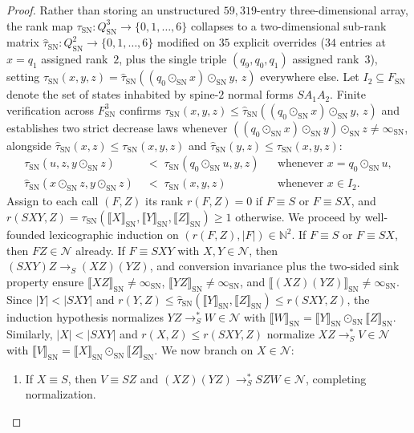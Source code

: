 \documentclass[11pt,reqno]{amsart}
\numberwithin{equation}{section}
\theoremstyle{plain}
\theoremstyle{definition}
\theoremstyle{remark}
\newcommand{\SN}{\mathrm{SN}}
\newcommand{\sem}[1]{\llbracket #1 \rrbracket}
\newcommand{\redS}{\to_S}
\newcommand{\redSs}{\to_S^*}
\begin{document}
\begin{proof}
Rather than storing an unstructured $59{,}319$-entry three-dimensional array, the rank map $\tau_{\SN} \colon Q_{\SN}^3 \to \{0, 1, \dots, 6\}$ collapses to a two-dimensional sub-rank matrix $\hat{\tau}_{\SN} \colon Q_{\SN}^2 \to \{0, 1, \dots, 6\}$ modified on $35$ explicit overrides ($34$ entries at $x = q_1$ assigned rank~$2$, plus the single triple $(q_9, q_0, q_1)$ assigned rank~$3$), setting $\tau_{\SN}(x, y, z) = \hat{\tau}_{\SN}((q_0 \odot_{\SN} x) \odot_{\SN} y,\, z)$ everywhere else. Let $I_2 \subseteq F_{\SN}$ denote the set of states inhabited by spine-$2$ normal forms $S A_1 A_2$. Finite verification across $F_{\SN}^3$ confirms $\tau_{\SN}(x, y, z) \le \hat{\tau}_{\SN}((q_0 \odot_{\SN} x) \odot_{\SN} y,\, z)$ and establishes two strict decrease laws whenever $((q_0 \odot_{\SN} x) \odot_{\SN} y) \odot_{\SN} z \neq \infty_{\SN}$, alongside $\hat{\tau}_{\SN}(x, z) \le \tau_{\SN}(x, y, z)$ and $\hat{\tau}_{\SN}(y, z) \le \tau_{\SN}(x, y, z)$:
\begin{align}
\tau_{\SN}(u, z, y \odot_{\SN} z) &\;<\; \tau_{\SN}(q_0 \odot_{\SN} u, y, z)
&&\textrm{whenever } x = q_0 \odot_{\SN} u, \label{eq:sn-rank-1}\\
\hat{\tau}_{\SN}(x \odot_{\SN} z, y \odot_{\SN} z) &\;<\; \tau_{\SN}(x, y, z)
&&\textrm{whenever } x \in I_2. \label{eq:sn-rank-2}
\end{align}
Assign to each call $(F, Z)$ its rank $r(F, Z) = 0$ if $F \equiv S$ or $F \equiv S X$, and $r(S X Y, Z) = \tau_{\SN}(\sem{X}_{\SN}, \sem{Y}_{\SN}, \sem{Z}_{\SN}) \ge 1$ otherwise. We proceed by well-founded lexicographic induction on $(r(F, Z), |F|) \in \mathbb{N}^2$. If $F \equiv S$ or $F \equiv S X$, then $F Z \in \mathcal{N}$ already. If $F \equiv S X Y$ with $X, Y \in \mathcal{N}$, then $(S X Y) Z \redS (X Z)(Y Z)$, and conversion invariance plus the two-sided sink property ensure $\sem{X Z}_{\SN} \neq \infty_{\SN}$, $\sem{Y Z}_{\SN} \neq \infty_{\SN}$, and $\sem{(X Z)(Y Z)}_{\SN} \neq \infty_{\SN}$. Since $|Y| < |S X Y|$ and $r(Y, Z) \le \hat{\tau}_{\SN}(\sem{Y}_{\SN}, \sem{Z}_{\SN}) \le r(S X Y, Z)$, the induction hypothesis normalizes $Y Z \redSs W \in \mathcal{N}$ with $\sem{W}_{\SN} = \sem{Y}_{\SN} \odot_{\SN} \sem{Z}_{\SN}$. Similarly, $|X| < |S X Y|$ and $r(X, Z) \le r(S X Y, Z)$ normalize $X Z \redSs V \in \mathcal{N}$ with $\sem{V}_{\SN} = \sem{X}_{\SN} \odot_{\SN} \sem{Z}_{\SN}$. We now branch on $X \in \mathcal{N}$:
\begin{enumerate}[label=(\roman*),leftmargin=2.2em]
  \item If $X \equiv S$, then $V \equiv S Z$ and $(X Z)(Y Z) \redSs S Z W \in \mathcal{N}$, completing normalization.

\end{enumerate}
\end{proof}
\end{document}
